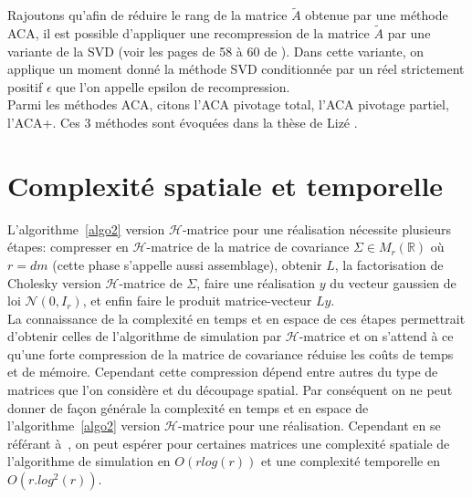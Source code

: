 Rajoutons qu'afin de réduire le rang de la matrice $\tilde{A}$ obtenue par une méthode ACA, il est possible d'appliquer une recompression de la matrice $\tilde{A}$
par une variante de la SVD (voir les pages de 58 à 60 de \cite{LizéBenoît2014Rdrp}). Dans cette variante, on applique un moment donné la méthode SVD conditionnée par un réel
strictement positif $\epsilon$ que l'on appelle epsilon de recompression.\\

Parmi les méthodes ACA, citons l'ACA pivotage total, l'ACA pivotage partiel, l'ACA+. Ces 3
méthodes sont évoquées dans la thèse de Lizé \cite{LizéBenoît2014Rdrp}.


\section{Complexité spatiale et temporelle}
L'algorithme~\ref{algo2} version $\mathcal{H}$-matrice pour une réalisation
nécessite plusieurs étapes: compresser en $\mathcal{H}$-matrice de la matrice de covariance $\Sigma \in M_{r}(\mathbb{R})$ où $r=dm$ (cette phase s'appelle aussi assemblage),
obtenir $L$, la factorisation de Cholesky version $\mathcal{H}$-matrice de $\Sigma$,
faire une réalisation $y$ du vecteur gaussien de loi $\mathcal{N}(0,I_{r})$,
et enfin faire le produit matrice-vecteur $Ly$.
~\\

La connaissance de la complexité en temps et en espace de ces étapes
permettrait d'obtenir celles de l'algorithme de simulation par
$\mathcal{H}$-matrice et on s'attend à ce qu'une forte compression de la matrice de
covariance réduise les coûts de temps et de mémoire. Cependant
cette compression dépend entre autres du type de matrices que l'on considère et
du découpage spatial. Par conséquent on ne peut donner de façon générale
la complexité en temps et en espace de l'algorithme~\ref{algo2} version $\mathcal{H}$-matrice pour une réalisation. Cependant en se référant à~\cite{LizéBenoît2014Rdrp},
on peut espérer pour certaines matrices une complexité spatiale de l'algorithme de simulation en $O(rlog(r))$ et une complexité temporelle en $O(r.log^2(r))$.

